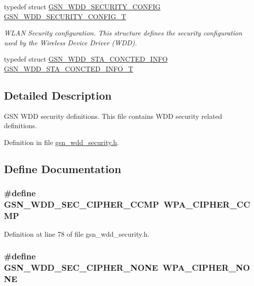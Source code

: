\begin{DoxyCompactItemize}
typedef struct \hyperlink{a00297}{GSN\_\-WDD\_\-SECURITY\_\-CONFIG} \hyperlink{a00604_ab50f348fec494c964d4301472eee16de}{GSN\_\-WDD\_\-SECURITY\_\-CONFIG\_\-T}
\begin{DoxyCompactList}\small\item\em WLAN Security configuration. This structure defines the security configuration used by the Wireless Device Driver (WDD). \end{DoxyCompactList}\item 
typedef struct \hyperlink{a00298}{GSN\_\-WDD\_\-STA\_\-CONCTED\_\-INFO} \hyperlink{a00604_a59d65918cc1820c2c0edfb9df7202cfa}{GSN\_\-WDD\_\-STA\_\-CONCTED\_\-INFO\_\-T}
\end{DoxyCompactItemize}


\subsection{Detailed Description}
GSN WDD security definitions. This file contains WDD security related definitions. 

Definition in file \hyperlink{a00604_source}{gsn\_\-wdd\_\-security.h}.



\subsection{Define Documentation}
\hypertarget{a00604_a05b7168f2cc6e831dd8855633e4741c3}{
\subsubsection[{GSN\_\-WDD\_\-SEC\_\-CIPHER\_\-CCMP}]{\setlength{\rightskip}{0pt plus 5cm}\#define GSN\_\-WDD\_\-SEC\_\-CIPHER\_\-CCMP~WPA\_\-CIPHER\_\-CCMP}}
\label{a00604_a05b7168f2cc6e831dd8855633e4741c3}


Definition at line 78 of file gsn\_\-wdd\_\-security.h.

\hypertarget{a00604_ad56583332743d373461e38f481a6a417}{
\subsubsection[{GSN\_\-WDD\_\-SEC\_\-CIPHER\_\-NONE}]{\setlength{\rightskip}{0pt plus 5cm}\#define GSN\_\-WDD\_\-SEC\_\-CIPHER\_\-NONE~WPA\_\-CIPHER\_\-NONE}}
\label{a00604_ad56583332743d373461e38f481a6a417}


